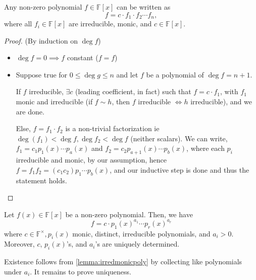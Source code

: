 \documentclass[12pt,oneside]{article}
\begin{document}
\begin{lemma}\label{lemma:irredmonicpoly}
  Any non-zero polynomial $f \in \mathbb{F}[x]$ can be written as \[f = c \cdot f_1 \cdot f_2 \cdots f_n, \]
  where all $f_i \in \mathbb{F}[x]$ are irreducible, monic, and $c \in \mathbb{F}[x]$.
\end{lemma}
\begin{proof}
  (By induction on $\deg f$)
  \begin{itemize}
    \item $\deg f = 0 \implies f$ constant ($f = f$)
    \item Suppose true for $0 \leq \deg g \leq n$ and let $f$ be a polynomial of $\deg f = n+1$. 
    
    If $f$ irreducible, $\exists c$ (leading coefficient, in fact) such that $f = c \cdot f_1$, with $f_1$ monic and irreducible (if $f \sim h$, then $f$ irreducible $\iff h$ irreducible), and we are done.

    Else, $f = f_1 \cdot f_2$ is a non-trivial factorization ie $\deg (f_1) < \deg f, \deg f_2 < \deg f$ (neither scalars). We can write, $f_1 = c_1 p_1(x) \cdots p_a(x)$ and $f_2 = c_2 p_{a+1}(x) \cdots p_b (x)$, where each $p_i$ irreducible and monic, by our assumption, hence $f = f_1 f_2 = (c_1 c_2) p_1 \cdots p_b (x)$, and our inductive step is done and thus the statement holds.
  \end{itemize}
\end{proof}

\begin{theorem}\label{thm:ufpoly}
  Let $f(x) \in \mathbb{F}[x]$ be a non-zero polynomial. Then, we have \[f = c \cdot p_1 (x)^{a_1} \cdots p_r(x)^{a_r}\] where $c \in \mathbb{F}^{\times}, p_i (x)$ monic, distinct, irreducible polynomials, and $a_i > 0$. Moreover, $c$, $p_i(x)$'s, and $a_i$'s are uniquely determined.
\end{theorem}
\begin{remark}
  Existence follows from \cref{lemma:irredmonicpoly} by collecting like polynomials under $a_i$. It remains to prove uniqueness.
\end{remark}
\end{document}
